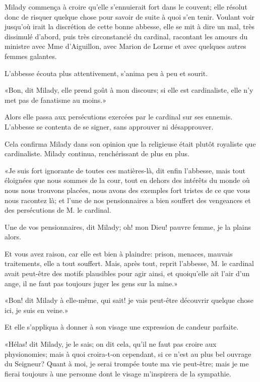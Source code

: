Milady commença à croire qu'elle s'ennuierait fort dans le couvent; elle résolut donc de risquer quelque chose pour savoir de suite à quoi s'en tenir. Voulant voir jusqu'où irait la discrétion de cette bonne abbesse, elle se mit à dire un mal, très dissimulé d'abord, puis très circonstancié du cardinal, racontant les amours du ministre avec Mme d'Aiguillon, avec Marion de Lorme et avec quelques autres femmes galantes. 

L'abbesse écouta plus attentivement, s'anima peu à peu et sourit. 

«Bon, dit Milady, elle prend goût à mon discours; si elle est cardinaliste, elle n'y met pas de fanatisme au moins.» 

Alors elle passa aux persécutions exercées par le cardinal sur ses ennemis. L'abbesse se contenta de se signer, sans approuver ni désapprouver. 

Cela confirma Milady dans son opinion que la religieuse était plutôt royaliste que cardinaliste. Milady continua, renchérissant de plus en plus. 

«Je suis fort ignorante de toutes ces matières-là, dit enfin l'abbesse, mais tout éloignées que nous sommes de la cour, tout en dehors des intérêts du monde où nous nous trouvons placées, nous avons des exemples fort tristes de ce que vous nous racontez là; et l'une de nos pensionnaires a bien souffert des vengeances et des persécutions de M. le cardinal. 

\speak  Une de vos pensionnaires, dit Milady; oh! mon Dieu! pauvre femme, je la plains alors. 

\speak  Et vous avez raison, car elle est bien à plaindre: prison, menaces, mauvais traitements, elle a tout souffert. Mais, après tout, reprit l'abbesse, M. le cardinal avait peut-être des motifs plausibles pour agir ainsi, et quoiqu'elle ait l'air d'un ange, il ne faut pas toujours juger les gens sur la mine.» 

«Bon! dit Milady à elle-même, qui sait! je vais peut-être découvrir quelque chose ici, je suis en veine.» 

Et elle s'appliqua à donner à son visage une expression de candeur parfaite. 

«Hélas! dit Milady, je le sais; on dit cela, qu'il ne faut pas croire aux physionomies; mais à quoi croira-t-on cependant, si ce n'est au plus bel ouvrage du Seigneur? Quant à moi, je serai trompée toute ma vie peut-être; mais je me fierai toujours à une personne dont le visage m'inspirera de la sympathie. 

